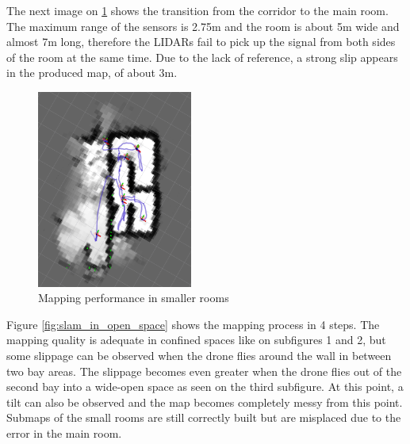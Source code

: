 \newpage

The next image on \ref{fig:second_building_main_transition} shows the transition from the corridor to the
main room. The maximum range of the sensors is 2.75m and the room is about 5m wide and almost 7m long,
therefore the LIDARs fail to pick up the signal from both sides of the room at the same time. Due to the lack
of reference, a strong slip appears in the produced map, of about 3m.

\begin{figure}[!ht]
    \centering
    \includegraphics[height=65mm, keepaspectratio]{figures/building2_small_room03.png}
    \caption{Mapping performance in smaller rooms}
    \label{fig:second_building_main_transition}
\end{figure}

Figure \ref{fig:slam_in_open_space} shows the mapping process in 4 steps. The mapping quality is adequate
in confined spaces like on subfigures 1 and 2, but some slippage can be observed when the drone flies
around the wall in between two bay areas. The slippage becomes even greater when the drone flies out of
the second bay into a wide-open space as seen on the third subfigure. At this point, a tilt can also be
observed and the map becomes completely messy from this point. Submaps of the small rooms are still
correctly built but are misplaced due to the error in the main room.


